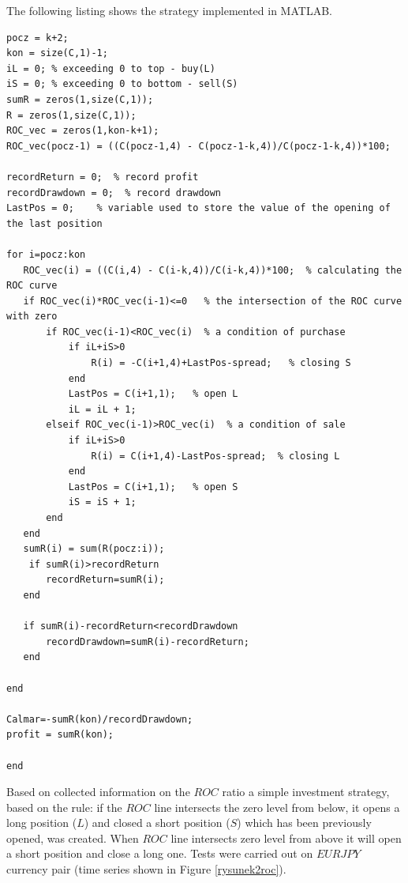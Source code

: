 \noindent The following listing shows the strategy implemented in MATLAB.
\begin{scriptsize}
\begin{lstlisting}
pocz = k+2;	
kon = size(C,1)-1;
iL = 0; % exceeding 0 to top - buy(L)
iS = 0; % exceeding 0 to bottom - sell(S)
sumR = zeros(1,size(C,1));
R = zeros(1,size(C,1));
ROC_vec = zeros(1,kon-k+1);
ROC_vec(pocz-1) = ((C(pocz-1,4) - C(pocz-1-k,4))/C(pocz-1-k,4))*100;

recordReturn = 0;  % record profit
recordDrawdown = 0;  % record drawdown
LastPos = 0;    % variable used to store the value of the opening of the last position

for i=pocz:kon
   ROC_vec(i) = ((C(i,4) - C(i-k,4))/C(i-k,4))*100;  % calculating the ROC curve
   if ROC_vec(i)*ROC_vec(i-1)<=0   % the intersection of the ROC curve with zero
       if ROC_vec(i-1)<ROC_vec(i)  % a condition of purchase
           if iL+iS>0
               R(i) = -C(i+1,4)+LastPos-spread;   % closing S
           end
           LastPos = C(i+1,1);   % open L
           iL = iL + 1;
       elseif ROC_vec(i-1)>ROC_vec(i)  % a condition of sale
           if iL+iS>0
               R(i) = C(i+1,4)-LastPos-spread;  % closing L
           end
           LastPos = C(i+1,1);   % open S
           iS = iS + 1;
       end
   end
   sumR(i) = sum(R(pocz:i));
    if sumR(i)>recordReturn
       recordReturn=sumR(i);
   end
  
   if sumR(i)-recordReturn<recordDrawdown
       recordDrawdown=sumR(i)-recordReturn; 
   end

end

Calmar=-sumR(kon)/recordDrawdown;
profit = sumR(kon);

end
\end{lstlisting}
\end{scriptsize}


Based on collected information on the $ROC$ ratio a simple investment strategy, based on the rule: if the $ROC$ line intersects the zero level from below, it opens a long position ($L$) and closed a short position ($S$) which has been previously opened, was created. When $ROC$ line intersects zero level from above it will open a short position and close a long one. Tests were carried out on $EURJPY$ currency pair (time series shown in Figure \ref{rysunek2roc}).\\

